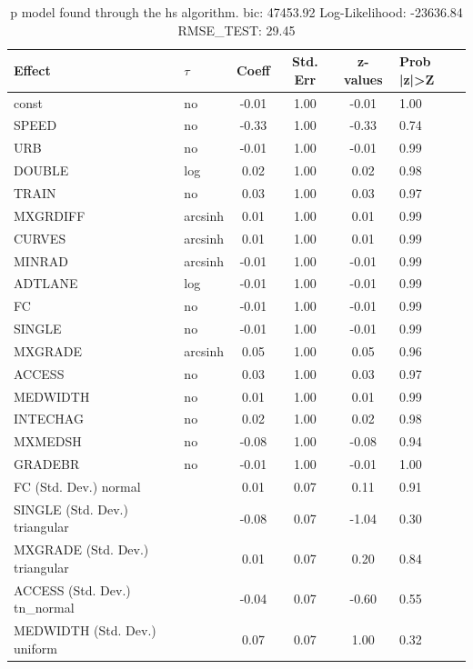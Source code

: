\begin{table}
	\caption{p model found through the hs algorithm. bic: 47453.92 Log-Likelihood: -23636.84 RMSE_TEST: 29.45}
	\begin{center}
		\begin{tabular}{|l|l|c|c|c|l|}
			\hline
			Effect & $\tau$ & Coeff & Std. Err & z-values & Prob |z|>Z \\
			\hline
			const & no & -0.01 & 1.00 & -0.01 & 1.00 \\
			\hline
			SPEED & no & -0.33 & 1.00 & -0.33 & 0.74 \\
			\hline
			URB & no & -0.01 & 1.00 & -0.01 & 0.99 \\
			\hline
			DOUBLE & log & 0.02 & 1.00 & 0.02 & 0.98 \\
			\hline
			TRAIN & no & 0.03 & 1.00 & 0.03 & 0.97 \\
			\hline
			MXGRDIFF & arcsinh & 0.01 & 1.00 & 0.01 & 0.99 \\
			\hline
			CURVES & arcsinh & 0.01 & 1.00 & 0.01 & 0.99 \\
			\hline
			MINRAD & arcsinh & -0.01 & 1.00 & -0.01 & 0.99 \\
			\hline
			ADTLANE & log & -0.01 & 1.00 & -0.01 & 0.99 \\
			\hline
			FC & no & -0.01 & 1.00 & -0.01 & 0.99 \\
			\hline
			SINGLE & no & -0.01 & 1.00 & -0.01 & 0.99 \\
			\hline
			MXGRADE & arcsinh & 0.05 & 1.00 & 0.05 & 0.96 \\
			\hline
			ACCESS & no & 0.03 & 1.00 & 0.03 & 0.97 \\
			\hline
			MEDWIDTH & no & 0.01 & 1.00 & 0.01 & 0.99 \\
			\hline
			INTECHAG & no & 0.02 & 1.00 & 0.02 & 0.98 \\
			\hline
			MXMEDSH & no & -0.08 & 1.00 & -0.08 & 0.94 \\
			\hline
			GRADEBR & no & -0.01 & 1.00 & -0.01 & 1.00 \\
			\hline
			FC (Std. Dev.) normal &  & 0.01 & 0.07 & 0.11 & 0.91 \\
			\hline
			SINGLE (Std. Dev.) triangular &  & -0.08 & 0.07 & -1.04 & 0.30 \\
			\hline
			MXGRADE (Std. Dev.) triangular &  & 0.01 & 0.07 & 0.20 & 0.84 \\
			\hline
			ACCESS (Std. Dev.) tn_normal &  & -0.04 & 0.07 & -0.60 & 0.55 \\
			\hline
			MEDWIDTH (Std. Dev.) uniform &  & 0.07 & 0.07 & 1.00 & 0.32 \\

\end{tabular}
\end{center}
\end{table}
